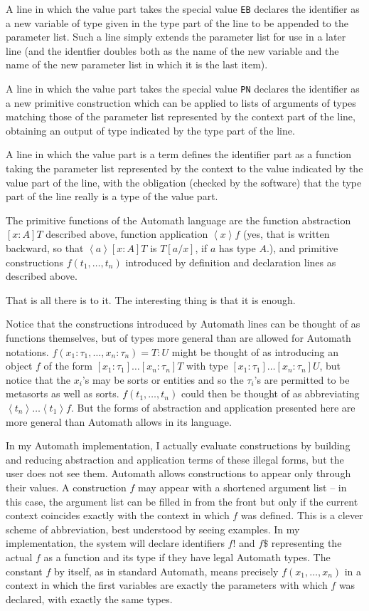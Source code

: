 \documentclass[12pt]{article}
\begin{document}
A line in which the value part takes the special value {\tt EB} declares the identifier as a new variable of type given in the type part of the line to be appended to the parameter list.  Such a line simply extends the parameter list for use in a later line (and the identfier doubles both as the name of the new variable and the name of the new parameter list in which it is the last item).

A line in which the value part takes the special value {\tt PN} declares the identifier as a new primitive construction which can be applied to lists of arguments of types matching those of the parameter list represented by the context part of the line, obtaining an output of type indicated by the type part of the line.

A line in which the value part is a term defines the identifier part as a function taking the parameter list represented by the context to the value indicated by the value part of the line, with the obligation (checked by the software) that the type part of the line really is a type of the value part.

The primitive functions of the Automath language are the function abstraction $[x:A]T$ described above, function application $\left<x\right>f$ (yes, that is written backward, so that
$\left<a\right>[x:A]T$ is $T[a/x]$, if $a$ has type $A$.), and primitive constructions $f(t_1,\ldots,t_n)$ introduced by definition and declaration lines as described above.

That is all there is to it.  The interesting thing is that it is enough.

Notice that the constructions introduced by Automath lines can be thought of as functions themselves, but of types more general than are allowed for Automath notations.   $f(x_1:\tau_1,\ldots,x_n:\tau_n)=T:U$ might be thought of as introducing an object $f$ of the form $[x_1:\tau_1]\ldots[x_n:\tau_n]T$ with type $[x_1:\tau_1]\ldots[x_n:\tau_n]U$, but notice that the $x_i$'s may be sorts or entities and so the $\tau_i$'s are permitted to be metasorts as well as sorts.  $f(t_1,\ldots,t_n)$ could then be thought of as abbreviating $\left<t_n\right>\ldots\left<t_1\right>f$.  But the forms of abstraction and application presented here are more general than Automath allows in its language.

In my Automath implementation, I actually evaluate constructions by building and reducing abstraction and application terms of these illegal forms, but the user does not see them.
Automath allows constructions to appear only through their values.  A construction $f$ may appear with a shortened argument list -- in this case, the argument list can be filled in from the front but only if the current context coincides exactly with the context in which $f$ was defined.  This is a clever scheme of abbreviation, best understood by seeing examples.   In my implementation, the system will declare identifiers $f!$ and $f\$$ representing the actual $f$ as a function and its type if they have legal Automath types.  The constant $f$ by itself, 
as in standard Automath, means precisely $f(x_1,\ldots,x_n)$ in a context in which the first variables are exactly the parameters with which $f$ was declared, with exactly the same types.
\end{document}
